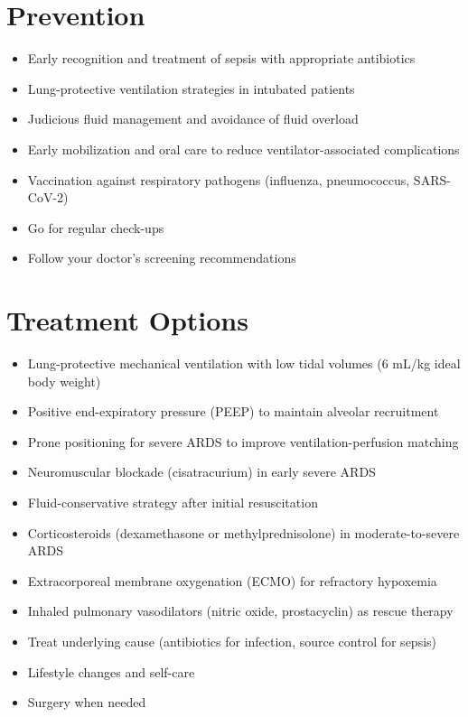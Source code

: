 \section{Prevention}

\begin{itemize}[noitemsep]
  \item Early recognition and treatment of sepsis with appropriate antibiotics
  \item Lung-protective ventilation strategies in intubated patients
  \item Judicious fluid management and avoidance of fluid overload
  \item Early mobilization and oral care to reduce ventilator-associated complications
  \item Vaccination against respiratory pathogens (influenza, pneumococcus, SARS-CoV-2)
  \item Go for regular check-ups
  \item Follow your doctor's screening recommendations
\end{itemize}

\section{Treatment Options}

\begin{itemize}[noitemsep]
  \item Lung-protective mechanical ventilation with low tidal volumes (6 mL/kg ideal body weight)
  \item Positive end-expiratory pressure (PEEP) to maintain alveolar recruitment
  \item Prone positioning for severe ARDS to improve ventilation-perfusion matching
  \item Neuromuscular blockade (cisatracurium) in early severe ARDS
  \item Fluid-conservative strategy after initial resuscitation
  \item Corticosteroids (dexamethasone or methylprednisolone) in moderate-to-severe ARDS
  \item Extracorporeal membrane oxygenation (ECMO) for refractory hypoxemia
  \item Inhaled pulmonary vasodilators (nitric oxide, prostacyclin) as rescue therapy
  \item Treat underlying cause (antibiotics for infection, source control for sepsis)
  \item Lifestyle changes and self-care
  \item Surgery when needed
\end{itemize}

